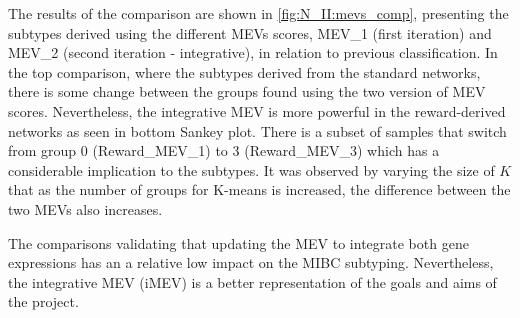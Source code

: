 The results of the comparison are shown in \cref{fig:N_II:mevs_comp}, presenting the subtypes derived using the different MEVs scores, MEV\_1 (first iteration) and MEV\_2 (second iteration - integrative), in relation to previous classification. In the top comparison, where the subtypes derived from the standard networks, there is some change between the groups found using the two version of MEV scores. Nevertheless, the integrative MEV is more powerful in the reward-derived networks as seen in bottom Sankey plot. There is a subset of samples that switch from group 0 (Reward\_MEV\_1) to 3 (Reward\_MEV\_3) which has a considerable implication to the subtypes. It was observed by varying the size of $K$ that as the number of groups for K-means is increased, the difference between the two MEVs also increases. 


The comparisons validating that updating the MEV to integrate both gene expressions has an a relative low impact on the MIBC subtyping. Nevertheless, the integrative MEV (iMEV) is a better representation of the goals and aims of the project.


